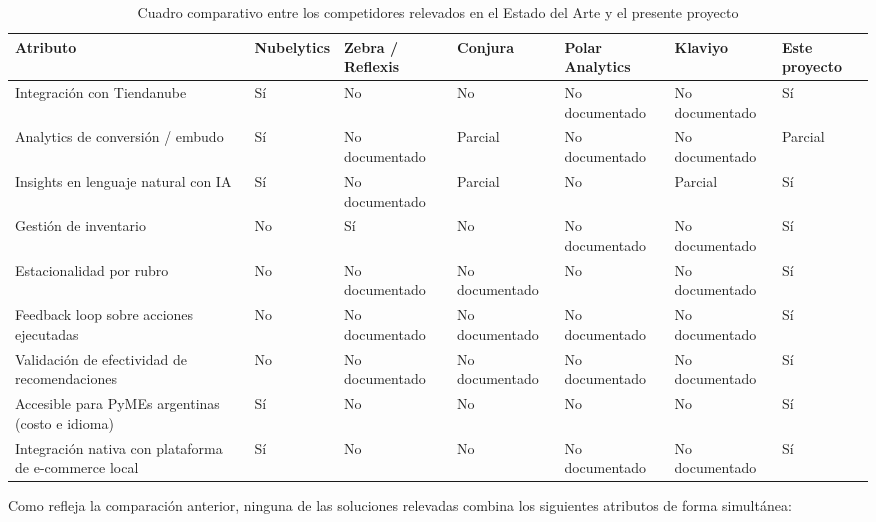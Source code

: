 \begin{table}[h]
\centering
\caption{Cuadro comparativo entre los competidores relevados en el Estado del Arte y el presente proyecto}
\label{tab:comparativo_nubelytics}
\renewcommand{\arraystretch}{1.3}
\footnotesize
\setlength{\tabcolsep}{3pt}
\begin{tabular}{|m{2.9cm}|m{1.75cm}|m{1.75cm}|m{1.75cm}|m{1.75cm}|m{1.75cm}|m{2cm}|}
\hline
\textbf{Atributo} & \textbf{Nubelytics} & \textbf{Zebra / Reflexis} & \textbf{Conjura} & \textbf{Polar Analytics} & \textbf{Klaviyo} & \textbf{Este proyecto} \\
\hline
Integración con Tiendanube & Sí & No & No & No documentado & No documentado & Sí \\
\hline
Analytics de conversión / embudo & Sí & No documentado & Parcial & No documentado & No documentado & Parcial \\
\hline
Insights en lenguaje natural con IA & Sí & No documentado & Parcial & No & Parcial & Sí \\
\hline
Gestión de inventario & No & Sí & No & No documentado & No documentado & Sí \\
\hline
Estacionalidad por rubro & No & No documentado & No documentado & No & No documentado & Sí \\
\hline
Feedback loop sobre acciones ejecutadas & No & No documentado & No documentado & No documentado & No documentado & Sí \\
\hline
Validación de efectividad de recomendaciones & No & No documentado & No documentado & No documentado & No documentado & Sí \\
\hline
Accesible para PyMEs argentinas (costo e idioma) & Sí & No & No & No & No & Sí \\
\hline
Integración nativa con plataforma de e-commerce local & Sí & No & No & No documentado & No documentado & Sí \\
\hline
\end{tabular}
\end{table}

Como refleja la comparación anterior, ninguna de las soluciones relevadas combina los siguientes atributos de forma simultánea:

